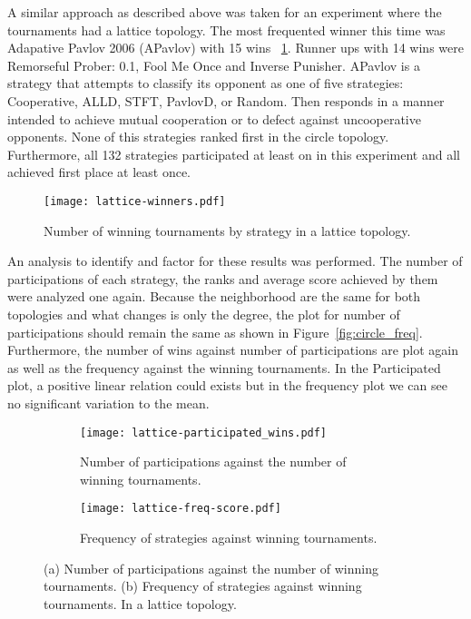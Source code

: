 A similar approach as described above was taken for an experiment where
the tournaments had a lattice topology. The most frequented winner this time
was Adapative Pavlov 2006 (APavlov) with 15 wins ~\ref{fig:lattice-winners}.
Runner ups with 14 wins were Remorseful
Prober: 0.1, Fool Me Once and Inverse Punisher. APavlov is a strategy that attempts
to classify its opponent as one of five strategies: Cooperative, ALLD, STFT,
PavlovD, or Random. Then responds in a manner intended to achieve mutual
cooperation or to defect against uncooperative opponents.
None of this strategies ranked first in the circle topology. Furthermore, all
132 strategies participated at least on in this experiment and all achieved
first place at least once.

\begin{figure}[h!]
  \hspace*{-2cm}
    \texttt{[image: lattice-winners.pdf]}
    \caption{Number of winning tournaments by strategy in a lattice topology.}
    \label{fig:lattice-winners}
\end{figure}

\newpage

An analysis to identify and factor for these results was performed.
The number of participations of each strategy, the ranks and average score
achieved by them were analyzed one again. Because the neighborhood are the same
for both topologies and what changes is only the degree, the plot for number of
participations should remain the same as shown in Figure~\ref{fig:circle_freq}.
Furthermore, the number of wins against number of participations are plot again
as well as the frequency against the winning tournaments. In the Participated
plot, a positive linear relation could exists but in the frequency plot
we can see no significant variation to the mean.

\newpage

\begin{figure}[h!]
\hspace*{-2cm}
    \begin{subfigure}[t]{1.2\textwidth}
    \centering
        \texttt{[image: lattice-participated\_wins.pdf]}
    \caption{Number of participations against the number of winning tournaments.}
    \end{subfigure}
\hfill
\hspace*{-2cm}
    \begin{subfigure}[t]{1.2\textwidth}\centering
    \centering
        \texttt{[image: lattice-freq-score.pdf]}
    \caption{Frequency of strategies against winning tournaments.}
    \end{subfigure}
\caption{(a) Number of participations against the number of winning tournaments.
         (b) Frequency of strategies against winning tournaments. In a lattice
         topology.}
\label{fig:lattice-part-wins}
\end{figure}

